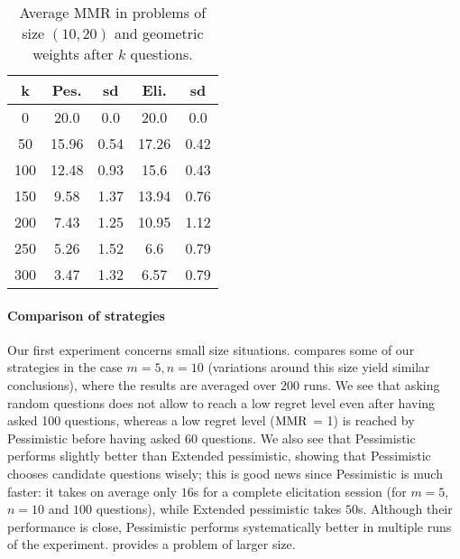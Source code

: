 \documentclass{article}
\begin{document}
\begin{table}[t]
	\caption{Average MMR in problems of size $(10, 20)$ and geometric weights after $k$ questions.}
	\label{tab:geometricWeights}
	\begin{tabular}{S[table-figures-integer=3, table-figures-decimal=0]S[table-number-alignment = right]@{ ± }S[table-number-alignment = left, table-figures-integer=1]S[table-number-alignment = right]@{ ± }S[table-number-alignment = left, table-figures-integer=1]}
		\toprule
		{k} & {Pes.} & {sd} & {Eli.} & {sd} \\
			&20.0	&0.0	&20.0	&0.0\\
		50	&15.96	&0.54	&17.26	&0.42\\
		100	&12.48	&0.93	&15.6	&0.43\\
		150	&9.58	&1.37	&13.94	&0.76\\
		200	&7.43	&1.25	&10.95	&1.12\\
		250	&5.26	&1.52	&6.6	&0.79\\
		300	&3.47	&1.32	&6.57	&0.79\\
		\bottomrule
	\end{tabular}
\end{table}
\paragraph{Comparison of strategies}
Our first experiment concerns small size situations.
 compares some of our strategies in the case $m = 5, n = 10$ (variations around this size yield similar conclusions), where the results are averaged over $200$ runs.
We see that asking random questions does not allow to reach a low regret level even after having asked 100 questions, whereas a low regret level ($\operatorname{MMR}$ = 1) is reached by Pessimistic before having asked 60 questions.
We also see that Pessimistic performs slightly better than Extended pessimistic, showing that Pessimistic chooses candidate questions wisely; this is good news since Pessimistic is much faster: it takes on average only $16$s for a complete elicitation session (for $m = 5$, $n = 10$ and $100$ questions), while Extended pessimistic takes $50$s. Although their performance is close, Pessimistic performs systematically better in multiple runs of the experiment.
 provides a problem of larger size.
\end{document}
